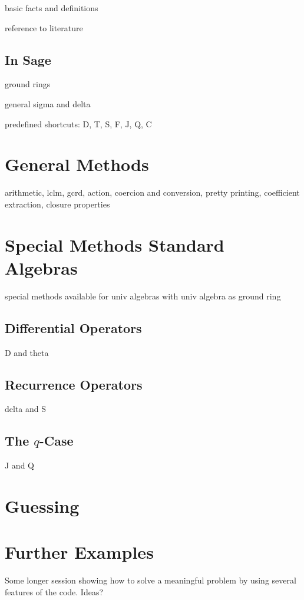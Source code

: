 \documentclass[a4paper,draft]{amsart}
\begin{document}
basic facts and definitions

reference to literature

\subsection{In Sage}

ground rings 

general sigma and delta

predefined shortcuts: D, T, S, F, J, Q, C

\section{General Methods}

arithmetic, lclm, gcrd, action, coercion and conversion, pretty printing, coefficient extraction,
closure properties

\section{Special Methods Standard Algebras}

special methods available for univ algebras with univ algebra as ground ring

\subsection{Differential Operators}

D and theta

\subsection{Recurrence Operators}

delta and S

\subsection{The $q$-Case}

J and Q

\section{Guessing}

\section{Further Examples}

Some longer session showing how to solve a meaningful problem by using several features of the code. Ideas?

\subsection{}

\subsection{}

 
 
 
\end{document}
